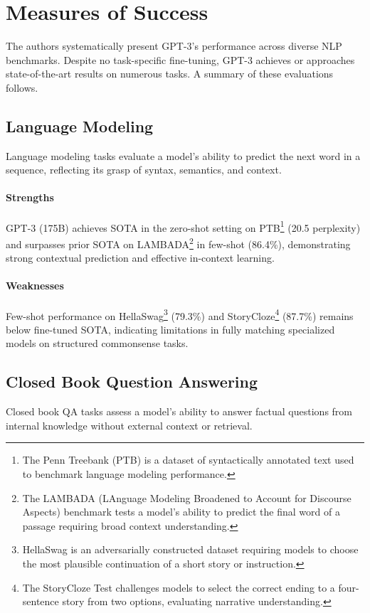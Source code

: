 \documentclass[10pt]{article}
\begin{document}
\section*{Measures of Success}
The authors systematically present GPT-3’s performance across diverse NLP benchmarks. Despite no task-specific fine-tuning, GPT-3 achieves or approaches state-of-the-art results on numerous tasks. A summary of these evaluations follows.

\subsection*{Language Modeling}
Language modeling tasks evaluate a model's ability to predict the next word in a sequence, reflecting its grasp of syntax, semantics, and context.

\paragraph{Strengths}
GPT-3 (175B) achieves SOTA in the zero-shot setting on PTB\footnote{The Penn Treebank (PTB) is a dataset of syntactically annotated text used to benchmark language modeling performance.} (20.5 perplexity) and surpasses prior SOTA on LAMBADA\footnote{The LAMBADA (LAnguage Modeling Broadened to Account for Discourse Aspects) benchmark tests a model's ability to predict the final word of a passage requiring broad context understanding.} in few-shot (86.4\%), demonstrating strong contextual prediction and effective in-context learning.

\paragraph{Weaknesses}
Few-shot performance on HellaSwag\footnote{HellaSwag is an adversarially constructed dataset requiring models to choose the most plausible continuation of a short story or instruction.} (79.3\%) and StoryCloze\footnote{The StoryCloze Test challenges models to select the correct ending to a four-sentence story from two options, evaluating narrative understanding.} (87.7\%) remains below fine-tuned SOTA, indicating limitations in fully matching specialized models on structured commonsense tasks.


\subsection*{Closed Book Question Answering}
Closed book QA tasks assess a model's ability to answer factual questions from internal knowledge without external context or retrieval.
\end{document}
